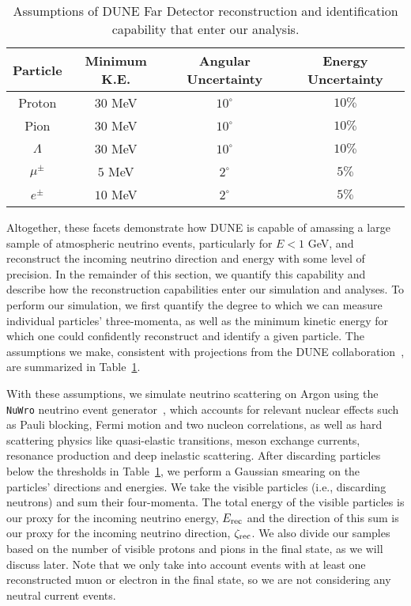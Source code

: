 \begin{table}
\begin{center}
\caption{Assumptions of DUNE Far Detector reconstruction and identification capability that enter our analysis. \label{tab:RecoAssumptions}}\vspace{0.1cm}
\begin{tabular}{|c||c|c|c|}\hline
Particle & Minimum K.E. & Angular Uncertainty & Energy Uncertainty \\ \hline\hline
Proton & $30$ MeV & $10^\circ$ & $10\%$ \\ \hline
Pion & $30$ MeV & $10^\circ$ & $10\%$ \\ \hline
$\Lambda$ & $30$ MeV & $10^\circ$ & $10\%$ \\ \hline
$\mu^\pm$ & $5$ MeV & $2^\circ$ & $5\%$ \\ \hline
$e^\pm$ & $10$ MeV & $2^\circ$ & $5\%$ \\ \hline 
\end{tabular}
\end{center}
\end{table}
Altogether, these facets demonstrate how DUNE is capable of amassing a large sample of atmospheric neutrino events, particularly for $E < 1$ GeV, and reconstruct the incoming neutrino direction and energy with some level of precision. In the remainder of this section, we quantify this capability and describe how the reconstruction capabilities enter our simulation and analyses. To perform our simulation, we first quantify the degree to which we can measure individual particles' three-momenta, as well as the minimum kinetic energy for which one could confidently reconstruct and identify a given particle. The assumptions we make, consistent with projections from the DUNE collaboration~\cite{DUNE:2020lwj, DUNE:2020ypp}, are summarized in Table~\ref{tab:RecoAssumptions}.

With these assumptions, we simulate neutrino scattering on Argon using the \texttt{NuWro} neutrino event generator~\cite{Golan:2012rfa}, which accounts for relevant nuclear effects such as Pauli blocking, Fermi motion and two nucleon correlations, as well as hard scattering physics like quasi-elastic transitions, meson exchange currents, resonance production and deep inelastic scattering.
After discarding particles below the thresholds in Table~\ref{tab:RecoAssumptions}, we perform a Gaussian smearing on the particles' directions and energies. We take the visible particles (i.e., discarding neutrons) and sum their four-momenta. The total energy of the visible particles is our proxy for the incoming neutrino energy, $E_{\rm rec}$ and the direction of this sum is our proxy for the incoming neutrino direction, $\zeta_{\rm rec}$. We also divide our samples based on the number of visible protons and pions in the final state, as we will discuss later. Note that we only take into account events with at least one reconstructed muon or electron in the final state, so we are not considering any neutral current events.

